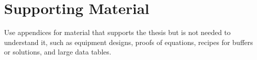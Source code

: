 \documentclass{upei-fos-thesis}
\begin{document}
\appendix

\chapter{Supporting Material}

Use appendices for material that supports the thesis but is not needed to understand
it, such as equipment designs, proofs of equations, recipes for buffers or solutions,
and large data tables.
\end{document}
